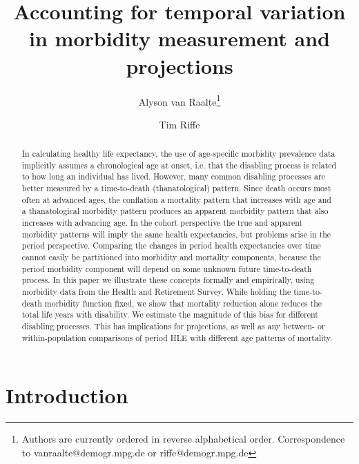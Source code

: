 \documentclass[11pt,oneside,a4paper]{article} %
\begin{document}
\title{Accounting for temporal variation in morbidity measurement
and projections}

\author[1]{Alyson van Raalte\thanks{Authors are currently ordered in reverse
alphabetical order. Correspondence to vanraalte@demogr.mpg.de or
riffe@demogr.mpg.de}}
\author[1]{Tim Riffe}


\maketitle

\begin{abstract}
In calculating healthy life expectancy, the use of age-specific morbidity
prevalence data implicitly assumes a chronological age at onset, i.e. that the
disabling process is related to how long an individual has lived. However, many
common disabling processes are better measured by a time-to-death
(thanatological) pattern.
Since death occurs most often at advanced ages, the conflation a mortality
pattern that increases with age and a thanatological morbidity pattern produces
an apparent morbidity pattern that also increases with advancing age. In the
cohort perspective the true and apparent morbidity patterns will imply the same
health expectancies, but problems arise in the period perspective. Comparing the
changes in period health expectancies over time cannot easily be partitioned
into morbidity and mortality components, because the period morbidity component
will depend on some unknown future time-to-death process. In this paper we
illustrate these concepts formally and empirically, using morbidity data from
the Health and Retirement Survey. While holding the time-to-death morbidity
function fixed, we show that mortality reduction alone reduces the total life
years with disability. We estimate the magnitude of this bias for different
disabling processes. This has implications for projections, as well as any
between- or within-population comparisons of period HLE with different age patterns of mortality.
\end{abstract}

\newpage
\section{Introduction}

\end{document}

